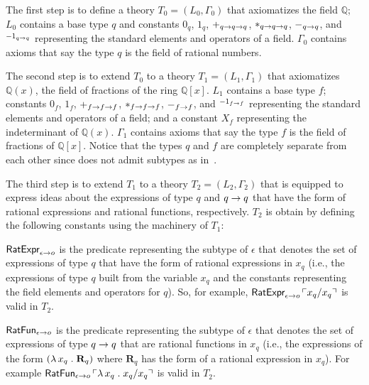 \documentclass[fleqn]{llncs}
\newcommand{\QQ}{\ensuremath{\mathbb{Q}}}
\begin{document}
The first step is to define a theory $T_0 = (L_0,\Gamma_0)$ that
axiomatizes the field $\QQ$;  $L_0$ contains a
base type $q$ and constants $0_q$, $1_q$, $+_{q \rightarrow q \rightarrow q}$,
$*_{q \rightarrow q \rightarrow q}$, $-_{q \rightarrow q}$, and
$\phantom{}^{{-1}_{q \rightarrow q}}$ representing the standard elements
and operators of a field.  $\Gamma_0$ contains axioms that say the
type $q$ is the field of rational numbers.

The second step is to extend $T_0$ to a theory $T_1 = (L_1,\Gamma_1)$
that axiomatizes $\QQ(x)$, the field of fractions of the ring
$\QQ[x]$.  $L_1$ contains a base type $f$; constants $0_f$, $1_f$,
$+_{f \rightarrow f \rightarrow f}$, $*_{f \rightarrow f \rightarrow f}$, $-_{f
  \rightarrow f}$, and $\phantom{}^{{-1}_{f \rightarrow f}}$ representing the
standard elements and operators of a field; and a constant $X_f$
representing the indeterminant of $\QQ(x)$.  $\Gamma_1$ contains
axioms that say the type $f$ is the field of fractions of $\QQ[x]$.
Notice that the types $q$ and $f$ are completely separate from each
other since {\churchuqe} does not admit subtypes as
in~\cite{Farmer93b}.

The third step is to extend $T_1$ to a theory $T_2 = (L_2,\Gamma_2)$
that is equipped to express ideas about the expressions of type $q$
and $q \rightarrow q$ that have the form of rational expressions and
rational functions, respectively.  $T_2$ is obtain by defining
the following constants  using the machinery of $T_1$:

\be

  \item $\mbox{\sf RatExpr}_{\epsilon \rightarrow o}$ is the predicate
    representing the subtype of $\epsilon$ that denotes the set of
    expressions of type $q$ that have the form of rational expressions
    in $x_q$ (i.e., the expressions of type $q$ built from the
    variable $x_q$ and the constants representing the field elements
    and operators for $q$).  So, for example,
    $\mbox{\sf RatExpr}_{\epsilon \rightarrow o} \, \ulcorner x_q/x_q\urcorner$ is
    valid in $T_2$.

  \item $\mbox{\sf RatFun}_{\epsilon \rightarrow o}$ is the predicate
    representing the subtype of $\epsilon$ that denotes the set of
    expressions of type $q \rightarrow q$ that are rational functions in
    $x_q$ (i.e., the expressions of the form $(\lambda\, x_q \mathrel.
    \textbf{R}_q)$ where $\textbf{R}_q$ has the
    form of a rational expression in $x_q$).  For example
    $\mbox{\sf RatFun}_{\epsilon \rightarrow o} \, \ulcorner\lambda\, x_q
      \mathrel. x_q/x_q\urcorner$ is valid in $T_2$.
\end{document}
